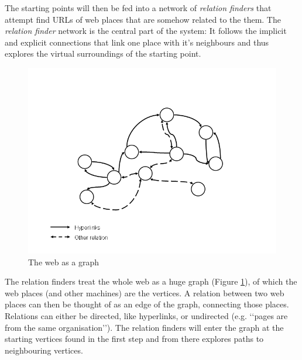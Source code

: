 \documentclass[a4paper,twoside]{danarticle}
\theoremstyle{remark}
\begin{document}
      The starting points will then be fed into a network of \textit{relation 
      finders} that attempt find URLs of web places that are somehow related to 
      the them. The \textit{relation finder} network is the central part of the 
      system: It follows the implicit and explicit connections that link one 
      place with it's neighbours and thus explores the virtual surroundings of 
      the starting point. 
      
      \begin{figure}[ht]
        \centering
        \includegraphics[width=12cm]{webgraph}
        \caption{The web as a graph}
        \label{webgraph}
      \end{figure}
      The relation finders treat the whole web as a huge graph (Figure
      \ref{webgraph}), of
      which the web places (and other machines) are the vertices. A relation
      between two web places can then be thought of as an edge of the graph,
      connecting those places. Relations can either be directed, like
      hyperlinks, or undirected (e.g. \lq\lq pages are from the same
      organisation\rq\rq). 
      The relation finders will enter the graph at the
      starting vertices found in the first step and from there explores paths to
      neighbouring vertices.
      
\end{document}
